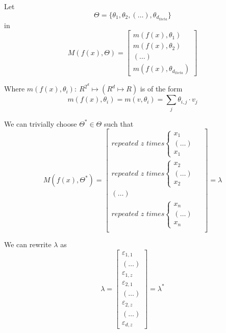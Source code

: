 \documentclass[11pt]{article}
\theoremstyle{definition}
\theoremstyle{definition}
\begin{document}
Let 
\begin{equation}
    \Theta = \{ \theta_1, \theta_2, (\dots), \theta_{d_{theta}} \}
\end{equation}
in
\begin{equation}
    M(f(x), \Theta)
    = 
    \begin{bmatrix}
        m(f(x), \theta_1) \\
        m(f(x), \theta_2) \\
        (\dots) \\
        m(f(x), \theta_{d_{theta}}) 
    \end{bmatrix}
\end{equation}

Where $m(f(x), \theta_i): \ R^{2^d} \mapsto (R^d \mapsto R)$ is of the form
\begin{equation}
    m(f(x), \theta_i)
    = 
    m(v, \theta_i)
    =
    \sum_j \theta_{i,j} \cdot v_j
\end{equation}

We can trivially choose $\Theta^* \in \Theta$ such that 
\begin{equation}
    M(f(x), \Theta^*)
    = 
    \begin{bmatrix}
        \textit{repeated $z$ times} 
        \begin{cases}
            x_1 &  \\
            (\dots) & \\
            x_1 & 
        \end{cases} \\
        \textit{repeated $z$ times} 

        \begin{cases}
            x_2 &  \\
            (\dots) & \\
            x_2 & 
        \end{cases} \\
        (\dots) \\
        \textit{repeated $z$ times} 
        \begin{cases}
            x_n &  \\
            (\dots) & \\
            x_n & 
        \end{cases} \\
    \end{bmatrix}
    = \lambda
\end{equation}

We can rewrite $\lambda$ as
\begin{equation} \label{star}
    \lambda 
    = 
    \begin{bmatrix}
        \varepsilon_{1, 1} \\
        (\dots) \\
        \varepsilon_{1, z} \\
        \varepsilon_{2, 1} \\
        (\dots) \\
        \varepsilon_{2, z} \\
        (\dots) \\
        \varepsilon_{d, z} 
    \end{bmatrix}
    = \lambda^*
\end{equation}
\end{document}
